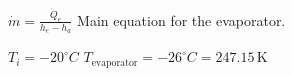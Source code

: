 \( \dot{m} = \frac{\dot{Q}_e}{h_e - h_a} \)  
Main equation for the evaporator.  

\( T_i = -20^\circ C \)  
\( T_{\text{evaporator}} = -26^\circ C = 247.15 \, \text{K} \)